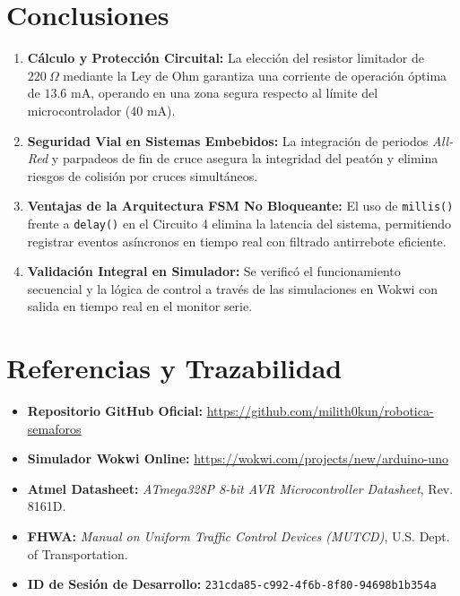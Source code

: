 \documentclass[11pt,a4paper]{article}
\begin{document}
\section{Conclusiones}
\begin{enumerate}
    \item \textbf{Cálculo y Protección Circuital:} La elección del resistor limitador de $220\ \Omega$ mediante la Ley de Ohm garantiza una corriente de operación óptima de $13.6\text{ mA}$, operando en una zona segura respecto al límite del microcontrolador ($40\text{ mA}$).
    \item \textbf{Seguridad Vial en Sistemas Embebidos:} La integración de periodos \textit{All-Red} y parpadeos de fin de cruce asegura la integridad del peatón y elimina riesgos de colisión por cruces simultáneos.
    \item \textbf{Ventajas de la Arquitectura FSM No Bloqueante:} El uso de \texttt{millis()} frente a \texttt{delay()} en el Circuito 4 elimina la latencia del sistema, permitiendo registrar eventos asíncronos en tiempo real con filtrado antirrebote eficiente.
    \item \textbf{Validación Integral en Simulador:} Se verificó el funcionamiento secuencial y la lógica de control a través de las simulaciones en Wokwi con salida en tiempo real en el monitor serie.
\end{enumerate}

\section{Referencias y Trazabilidad}
\begin{itemize}
    \item \textbf{Repositorio GitHub Oficial:} \url{https://github.com/milith0kun/robotica-semaforos}
    \item \textbf{Simulador Wokwi Online:} \url{https://wokwi.com/projects/new/arduino-uno}
    \item \textbf{Atmel Datasheet:} \textit{ATmega328P 8-bit AVR Microcontroller Datasheet}, Rev. 8161D.
    \item \textbf{FHWA:} \textit{Manual on Uniform Traffic Control Devices (MUTCD)}, U.S. Dept. of Transportation.
    \item \textbf{ID de Sesión de Desarrollo:} \texttt{231cda85-c992-4f6b-8f80-94698b1b354a}
\end{itemize}
\end{document}
